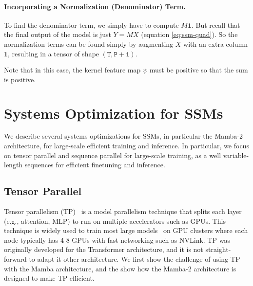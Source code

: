\documentclass{article}
\newcommand{\citep}{\parencite}
\begin{document}
\paragraph{Incorporating a Normalization (Denominator) Term.}

To find the denominator term, we simply have to compute $M \bm{1}$.
But recall that the final output of the model is just $Y = MX$ (equation \eqref{eq:ssm-quad}).
So the normalization terms can be found
simply by augmenting $X$ with an extra column $\bm{1}$, resulting in a tensor of shape $\mathtt{(T, P+1)}$.

Note that in this case, the kernel feature map $\psi$ must be positive so that the sum is positive.

\section{Systems Optimization for SSMs}
\label{sec:systems}

We describe several systems optimizations for SSMs, in particular the Mamba-2 architecture, for large-scale efficient training and inference.
In particular, we focus on tensor parallel and sequence parallel for large-scale training, as a well variable-length sequences for efficient finetuning and inference.

\subsection{Tensor Parallel}
\label{subsec:tp}

Tensor parallelism (TP)~\citep{shoeybi2019megatron} is a model parallelism technique that splits each layer (e.g., attention, MLP) to run on multiple accelerators such as GPUs.
This technique is widely used to train most large models~\citep{brown2020language, chowdhery2022palm, touvron2023llama, touvron2023llama2}  on GPU clusters where each node typically has 4-8 GPUs with fast networking such as NVLink.
TP was originally developed for the Transformer architecture, and it is not straight-forward to adapt it other architecture.
We first show the challenge of using TP with the Mamba architecture, and the show how the Mamba-2 architecture is designed to make TP efficient.
\end{document}
